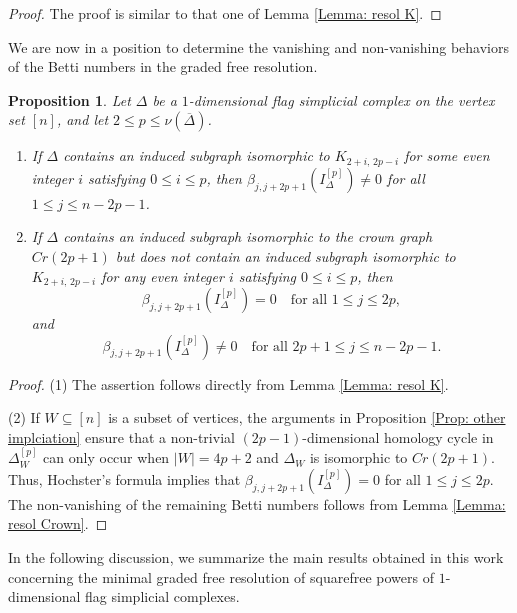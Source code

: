 \documentclass[12pt]{amsart}
\newtheorem{Proposition}[Theorem]{Proposition}
\begin{document}
  \begin{proof}
      The proof is similar to that one of Lemma \ref{Lemma: resol K}.
  \end{proof}

We are now in a position to determine the vanishing and non-vanishing behaviors of the Betti numbers in the graded free resolution.

\begin{Proposition}\label{Prop: non van betti}
Let $\Delta$ be a $1$-dimensional flag simplicial complex on the vertex set $[n]$, and let $2 \leq p \leq \nu(\overline{\Delta})$. 
\begin{enumerate}
    \item If $\Delta$ contains an induced subgraph isomorphic to $K_{2+i,\,2p-i}$ for some even integer $i$ satisfying $0 \leq i \leq p$, then $\beta_{j,j+2p+1}(I_\Delta^{[p]}) \neq 0$ for all $1 \leq j \leq n-2p-1$.
    \item If $\Delta$ contains an induced subgraph isomorphic to the crown graph $Cr(2p+1)$ but does not contain an induced subgraph isomorphic to $K_{2+i,\,2p-i}$ for any even integer $i$ satisfying $0 \leq i \leq p$, then 
    \[ \beta_{j,j+2p+1}(I_\Delta^{[p]}) = 0 \quad \text{for all } 1 \leq j \leq 2p, \]
    and 
    \[ \beta_{j,j+2p+1}(I_\Delta^{[p]}) \neq 0 \quad \text{for all } 2p+1 \leq j \leq n-2p-1. \]
\end{enumerate} 
\end{Proposition}

\begin{proof}
(1) The assertion follows directly from Lemma \ref{Lemma: resol K}.

(2) If $W \subseteq [n]$ is a subset of vertices, the arguments in Proposition \ref{Prop: other implciation} ensure that a non-trivial $(2p-1)$-dimensional homology cycle in $\Delta_W^{[p]}$ can only occur when $|W| = 4p+2$ and $\Delta_W$ is isomorphic to $Cr(2p+1)$. Thus, Hochster's formula implies that $\beta_{j,j+2p+1}(I_\Delta^{[p]}) = 0$ for all $1 \leq j \leq 2p$. The non-vanishing of the remaining Betti numbers follows from Lemma \ref{Lemma: resol Crown}.
\end{proof}

In the following discussion, we summarize the main results obtained in this work concerning the minimal graded free resolution of squarefree powers of $1$-dimensional flag simplicial complexes.  
\end{document}

